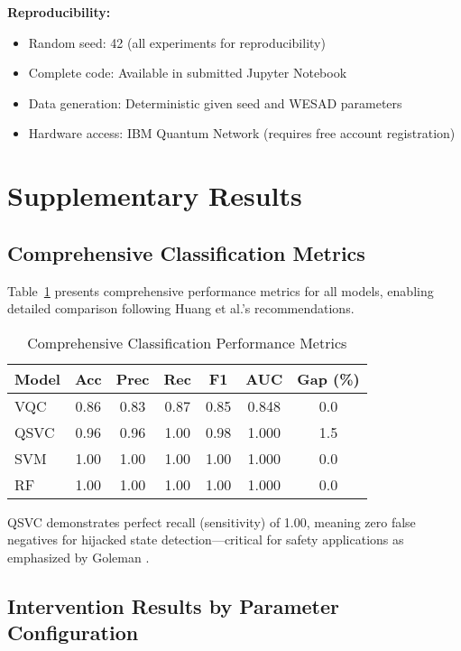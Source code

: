 \documentclass[11pt,letterpaper]{article}
\begin{document}
\textbf{Reproducibility:}
\begin{itemize}
\item Random seed: 42 (all experiments for reproducibility)
\item Complete code: Available in submitted Jupyter Notebook
\item Data generation: Deterministic given seed and WESAD parameters \cite{schmidt2018introducing}
\item Hardware access: IBM Quantum Network (requires free account registration)
\end{itemize}

\section{Supplementary Results}
\label{app:supplementary}

\subsection{Comprehensive Classification Metrics}

Table~\ref{tab:detailed_metrics} presents comprehensive performance metrics for all models, enabling detailed comparison following Huang et al.'s \cite{huang2021power} recommendations.

\begin{table}[h]
\centering
\caption{Comprehensive Classification Performance Metrics}
\label{tab:detailed_metrics}
\begin{tabular}{lcccccc}
\toprule
\textbf{Model} & \textbf{Acc} & \textbf{Prec} & \textbf{Rec} & \textbf{F1} & \textbf{AUC} & \textbf{Gap (\%)} \\
\midrule
VQC & 0.86 & 0.83 & 0.87 & 0.85 & 0.848 & 0.0 \\
QSVC & 0.96 & 0.96 & 1.00 & 0.98 & 1.000 & 1.5 \\
SVM & 1.00 & 1.00 & 1.00 & 1.00 & 1.000 & 0.0 \\
RF & 1.00 & 1.00 & 1.00 & 1.00 & 1.000 & 0.0 \\
\bottomrule
\end{tabular}
\end{table}

QSVC demonstrates perfect recall (sensitivity) of 1.00, meaning zero false negatives for hijacked state detection---critical for safety applications as emphasized by Goleman \cite{goleman1995emotional}.

\subsection{Intervention Results by Parameter Configuration}
\end{document}

